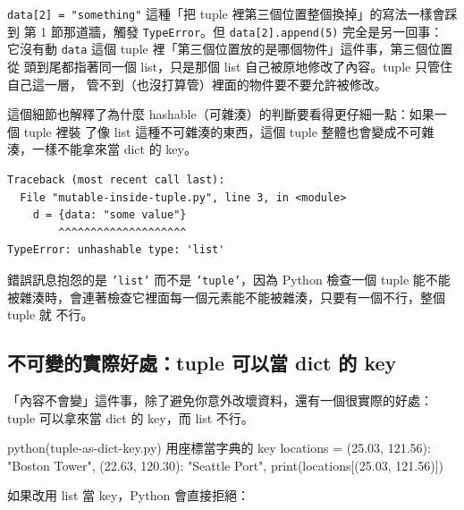 
\texttt{data[2] = "something"} 這種「把 tuple 裡第三個位置整個換掉」的寫法一樣會踩到
第 1 節那道牆，觸發 \texttt{TypeError}。但 \texttt{data[2].append(5)} 完全是另一回事：
它沒有動 \texttt{data} 這個 tuple 裡「第三個位置放的是哪個物件」這件事，第三個位置從
頭到尾都指著同一個 list，只是那個 list 自己被原地修改了內容。tuple 只管住自己這一層，
管不到（也沒打算管）裡面的物件要不要允許被修改。

這個細節也解釋了為什麼 hashable（可雜湊）的判斷要看得更仔細一點：如果一個 tuple 裡裝
了像 list 這種不可雜湊的東西，這個 tuple 整體也會變成不可雜湊，一樣不能拿來當 dict 的
key。

\begin{verbatim}
Traceback (most recent call last):
  File "mutable-inside-tuple.py", line 3, in <module>
    d = {data: "some value"}
        ^^^^^^^^^^^^^^^^^^^^
TypeError: unhashable type: 'list'
\end{verbatim}

錯誤訊息抱怨的是 \texttt{'list'} 而不是 \texttt{'tuple'}，因為 Python 檢查一個 tuple
能不能被雜湊時，會連著檢查它裡面每一個元素能不能被雜湊，只要有一個不行，整個 tuple 就
不行。


\subsection*{不可變的實際好處：tuple 可以當 dict 的 key}

「內容不會變」這件事，除了避免你意外改壞資料，還有一個很實際的好處：tuple 可以拿來當
dict 的 key，而 list 不行。

\begin{example}{python}{(tuple-as-dict-key.py) 用座標當字典的 key}
locations = {
    (25.03, 121.56): "Boston Tower",
    (22.63, 120.30): "Seattle Port",
}
print(locations[(25.03, 121.56)])
\end{example}


如果改用 list 當 key，Python 會直接拒絕：

